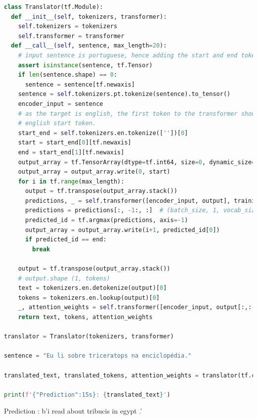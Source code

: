 \begin{lstlisting}[language=Python, style=input]
class Translator(tf.Module):
  def __init__(self, tokenizers, transformer):
    self.tokenizers = tokenizers
    self.transformer = transformer
  def __call__(self, sentence, max_length=20):
    # input sentence is portuguese, hence adding the start and end token
    assert isinstance(sentence, tf.Tensor)
    if len(sentence.shape) == 0:
      sentence = sentence[tf.newaxis]
    sentence = self.tokenizers.pt.tokenize(sentence).to_tensor()
    encoder_input = sentence
    # as the target is english, the first token to the transformer should be the
    # english start token.
    start_end = self.tokenizers.en.tokenize([''])[0]
    start = start_end[0][tf.newaxis]
    end = start_end[1][tf.newaxis]
    output_array = tf.TensorArray(dtype=tf.int64, size=0, dynamic_size=True)
    output_array = output_array.write(0, start)
    for i in tf.range(max_length):
      output = tf.transpose(output_array.stack())
      predictions, _ = self.transformer([encoder_input, output], training=False)
      predictions = predictions[:, -1:, :]  # (batch_size, 1, vocab_size)
      predicted_id = tf.argmax(predictions, axis=-1)
      output_array = output_array.write(i+1, predicted_id[0])
      if predicted_id == end:
        break

    output = tf.transpose(output_array.stack())
    # output.shape (1, tokens)
    text = tokenizers.en.detokenize(output)[0]
    tokens = tokenizers.en.lookup(output)[0]
    _, attention_weights = self.transformer([encoder_input, output[:,:-1]], training=False)
    return text, tokens, attention_weights

translator = Translator(tokenizers, transformer)

sentence = "Eu li sobre triceratops na enciclopédia."

translated_text, translated_tokens, attention_weights = translator(tf.constant(sentence))

print(f'{"Prediction":15s}: {translated_text}')
\end{lstlisting}

\begin{tcolorbox}[myoutputstyle]
Prediction     : b'i read about tribucis in egypt .'
\end{tcolorbox}